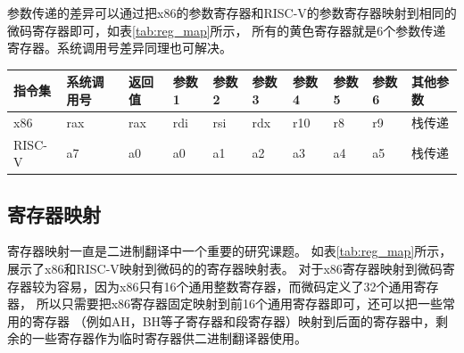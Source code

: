 参数传递的差异可以通过把x86的参数寄存器和RISC-V的参数寄存器映射到相同的微码寄存器即可，如表\ref{tab:reg_map}所示，
所有的黄色寄存器就是6个参数传递寄存器。系统调用号差异同理也可解决。



\begin{table}[h]
    \centering
    \footnotesize%
    \setlength{\tabcolsep}{4pt}%
    \renewcommand{\arraystretch}{1.2}%
      \begin{tabular}{llllllllll}
      \hline
      指令集 & 系统调用号 & 返回值 & 参数1 & 参数2 & 参数3 & 参数4 & 参数5 & 参数6 & 其他参数 \\ \hline
      x86     & rax    & rax   & rdi & rsi & rdx & r10 & r8  & r9  & 栈传递  \\
      RISC-V  & a7     & a0    & a0  & a1  & a2  & a3  & a4  & a5  & 栈传递 \\
      \hline
      \end{tabular}
    \label{tab:syscall}
  \end{table}
  

\subsection{寄存器映射}

寄存器映射一直是二进制翻译中一个重要的研究课题。
如表\ref{tab:reg_map}所示，展示了x86和RISC-V映射到微码的的寄存器映射表。
对于x86寄存器映射到微码寄存器较为容易，因为x86只有16个通用整数寄存器，而微码定义了32个通用寄存器，
所以只需要把x86寄存器固定映射到前16个通用寄存器即可，还可以把一些常用的寄存器
（例如AH，BH等子寄存器和段寄存器）映射到后面的寄存器中，剩余的一些寄存器作为临时寄存器供二进制翻译器使用。

